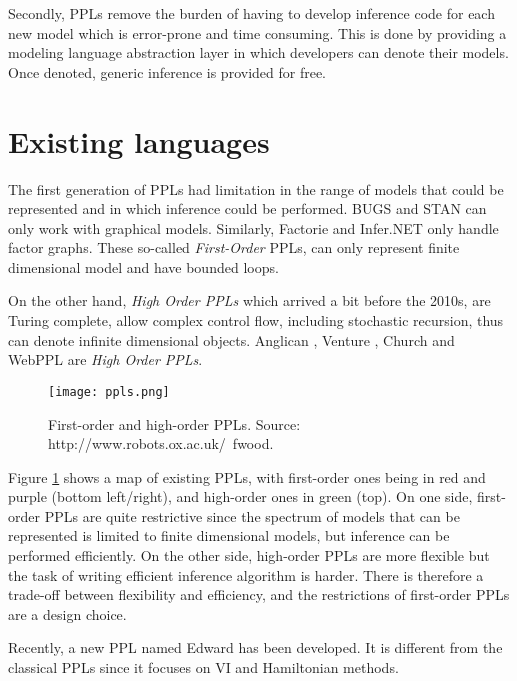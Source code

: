 Secondly, \glspl{PPL} remove the burden of having to develop inference code for each new model which is error-prone and time consuming.
This is done by providing a modeling language abstraction layer in which developers can denote their models.  Once denoted, generic inference is provided for free.

\section{Existing languages} \label{PPL_history}

The first generation of \glspl{PPL} had limitation in the range of models that could be represented and in which inference could be performed.
BUGS \cite{Bugs} and STAN \cite{Stan} can only work with graphical models.
Similarly, Factorie \cite{Factorie} and Infer.NET \cite{InferNET} only handle factor graphs.
These so-called \textit{First-Order} \glspl{PPL}, can only represent finite dimensional model and have bounded loops.

On the other hand, \textit{High Order \glspl{PPL}} which arrived a bit before the 2010s, are Turing complete, allow complex control flow, including stochastic recursion, thus can denote infinite dimensional objects.
Anglican \cite{wood-aistats-2014}, Venture \cite{Mansinghka:2014ty}, Church \cite{Goodman:2012uq} and WebPPL \cite{dippl} are \textit{High Order \glspl{PPL}}.

\begin{figure}[h!]
\centering
    \texttt{[image: ppls.png]} 
    \caption{First-order and high-order \glspl{PPL}. Source: http://www.robots.ox.ac.uk/~fwood.}
    \label{fig:ppls} 
\end{figure}

Figure \ref{fig:ppls} shows a map of existing \glspl{PPL}, with first-order ones being in red and purple (bottom left/right), and high-order ones in green (top).
On one side, first-order \glspl{PPL} are quite restrictive since the spectrum of models that can be represented is limited to finite dimensional models, but inference can be performed efficiently.
On the other side, high-order \glspl{PPL} are more flexible but the task of writing efficient inference algorithm is harder.
There is therefore a trade-off between flexibility and efficiency, and the restrictions of first-order \glspl{PPL} are a design choice.

Recently, a new \gls{PPL} named Edward \cite{Edward} has been developed. It is different from the classical \glspl{PPL} since it focuses on \gls{VI} and Hamiltonian methods.


